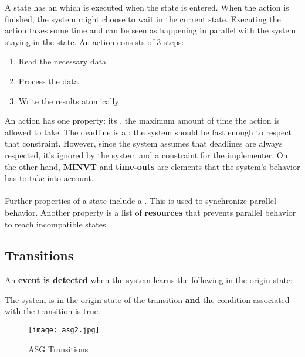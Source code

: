 \documentclass[../main.tex]{subfiles}
\begin{document}
A state has an  which is executed when the state is entered.
When the action is finished, the system might choose to wait in the current state.
Executing the action takes some time and can be seen as happening in parallel with the system staying in the state.
An action consists of 3 steps:
\begin{enumerate}
	\item Read the necessary data
	\item Process the data
	\item Write the results atomically
\end{enumerate}
An action has one property: its , the maximum amount of time the action is allowed to take.
The deadline is a : the system should be fast enough to respect that constraint.
However, since the system assumes that deadlines are always respected, it's ignored by the system and a constraint for the implementer.
On the other hand, \textbf{MINVT} and \textbf{time-outs} are elements that the system's behavior has to take into account.
\\\\
Further properties of a state include a .
This is used to synchronize parallel behavior.
Another property is a list of \textbf{resources} that  prevents parallel behavior to reach incompatible states.

\subsection{Transitions}
\begin{defn}
An \textbf{event is detected} when the system learns the following in the origin state:
\begin{center}
The system is in the origin state of the transition \textbf{and} the condition associated with the transition is true.
\end{center}
\end{defn}

\begin{figure}[H]
    \centering
    \texttt{[image: asg2.jpg]}
    \caption{ASG Transitions}
    \label{asg2}
\end{figure}
\end{document}
